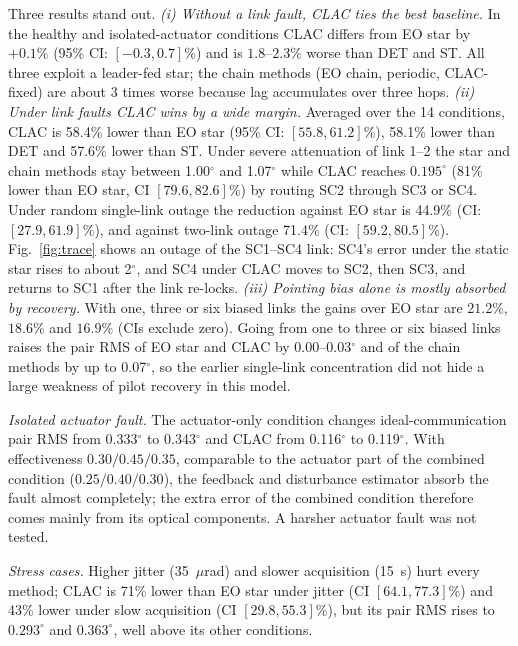 \documentclass[journal]{IEEEtran}
\begin{document}
\begin{table}[!t]
\caption{CLAC minus baseline: paired change in pair RMS (\%), mean [95\% CI]. Negative values favour CLAC.}
\label{tab:contrast}
\centering\scriptsize

\end{table}

Three results stand out.
\emph{(i) Without a link fault, CLAC ties the best baseline.} In the healthy and isolated-actuator conditions CLAC differs from EO star by $+0.1\%$ (95\% CI: $[-0.3,0.7]\%$) and is $1.8$--$2.3\%$ worse than DET and ST. All three exploit a leader-fed star; the chain methods (EO chain, periodic, CLAC-fixed) are about 3 times worse because lag accumulates over three hops.
\emph{(ii) Under link faults CLAC wins by a wide margin.} Averaged over the 14 conditions, CLAC is 58.4\% lower than EO star (95\% CI: $[55.8, 61.2]\%$), 58.1\% lower than DET and 57.6\% lower than ST. Under severe attenuation of link 1--2 the star and chain methods stay between 1.00$^\circ$ and 1.07$^\circ$ while CLAC reaches $0.195^\circ$ (81\% lower than EO star, CI $[79.6, 82.6]\%$) by routing SC2 through SC3 or SC4. Under random single-link outage the reduction against EO star is 44.9\% (CI: $[27.9, 61.9]\%$), and against two-link outage 71.4\% (CI: $[59.2, 80.5]\%$). Fig.~\ref{fig:trace} shows an outage of the SC1--SC4 link: SC4's error under the static star rises to about 2$^\circ$, and SC4 under CLAC moves to SC2, then SC3, and returns to SC1 after the link re-locks.
\emph{(iii) Pointing bias alone is mostly absorbed by recovery.} With one, three or six biased links the gains over EO star are $21.2\%$, $18.6\%$ and $16.9\%$ (CIs exclude zero). Going from one to three or six biased links raises the pair RMS of EO star and CLAC by 0.00--0.03$^\circ$ and of the chain methods by up to 0.07$^\circ$, so the earlier single-link concentration did not hide a large weakness of pilot recovery in this model.

\emph{Isolated actuator fault.} The actuator-only condition changes ideal-communication pair RMS from 0.333$^\circ$ to 0.343$^\circ$ and CLAC from 0.116$^\circ$ to 0.119$^\circ$. With effectiveness $0.30/0.45/0.35$, comparable to the actuator part of the combined condition ($0.25/0.40/0.30$), the feedback and disturbance estimator absorb the fault almost completely; the extra error of the combined condition therefore comes mainly from its optical components. A harsher actuator fault was not tested.

\emph{Stress cases.} Higher jitter (35~$\mu$rad) and slower acquisition (15~s) hurt every method; CLAC is 71\% lower than EO star under jitter (CI $[64.1, 77.3]\%$) and 43\% lower under slow acquisition (CI $[29.8, 55.3]\%$), but its pair RMS rises to $0.293^\circ$ and $0.363^\circ$, well above its other conditions.
\end{document}
